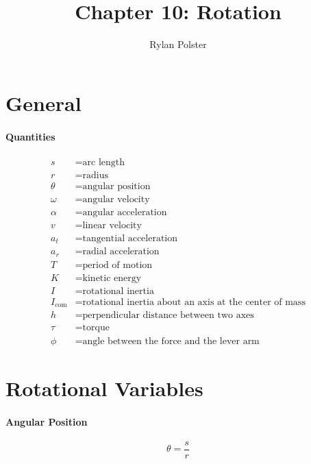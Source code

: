 \documentclass{article}
\title{Chapter 10: Rotation}
\author{Rylan Polster}
\begin{document}
    \maketitle

    \section*{General}

        \paragraph{Quantities}
        \begin{align}
            s &= \text{arc length} \nonumber\\
            r &= \text{radius} \nonumber\\
            \theta &= \text{angular position} \nonumber\\
            \omega &= \text{angular velocity} \nonumber\\
            \alpha &= \text{angular acceleration} \nonumber\\
            v &= \text{linear velocity} \nonumber\\
            a_t &= \text{tangential acceleration} \nonumber\\
            a_r &= \text{radial acceleration} \nonumber\\
            T &= \text{period of motion} \nonumber\\
            K &= \text{kinetic energy} \nonumber\\
            I &= \text{rotational inertia} \nonumber\\
            I_\text{com} &= \text{rotational inertia about an axis at the center of mass} \nonumber\\
            h &= \text{perpendicular distance between two axes} \nonumber\\
            \tau &= \text{torque} \nonumber\\
            \phi &= \text{angle between the force and the lever arm} \nonumber
        \end{align}

    \section{Rotational Variables}

        \paragraph{Angular Position}
        \begin{equation}
            \theta = \frac{s}{r}
        \end{equation}
\end{document}
